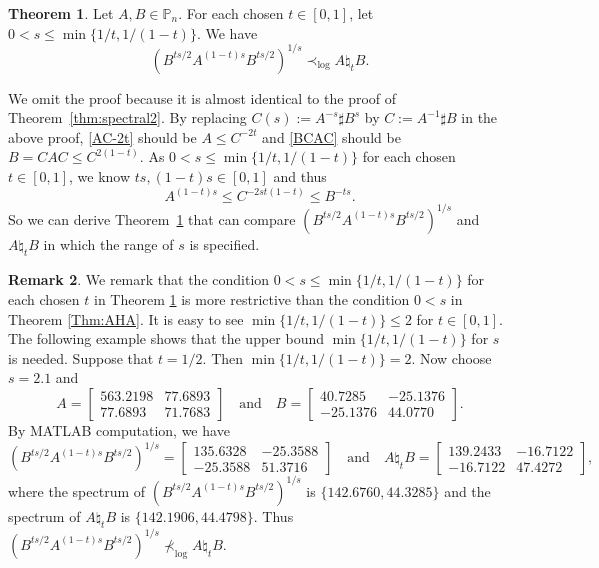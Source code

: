 \documentclass[12pt, reqno]{amsart}
\numberwithin{equation}{section}
\theoremstyle{definition}
\newtheorem{theorem}{Theorem}[section]
\newtheorem{remark}[theorem]{Remark}
\renewcommand{\le}{\leqslant}
\def\P{\mathbb P}
\begin{document}
\begin{theorem}\label{thm:spectral}
	Let $A, B \in \P_n$. For each chosen $t\in [0,1]$, let $0 < s \le \min\{1/t, 1/(1-t)\}$. We have
\begin{equation}\label{thm:natlog}
\left(B^{ts/2}A^{(1-t)s}B^{ts/2} \right)^{1/s}\prec_{\log} A \natural_t B.
\end{equation}
\end{theorem}

We omit the proof because it is almost identical to the proof of Theorem~\ref{thm:spectral2}. By replacing $C(s):=A^{-s}\sharp B^s$ by $C :=A^{-1}\sharp B$ in the above proof, \eqref{AC-2t} should be $A\le C^{-2t}$ and \eqref{BCAC} should be $B=CAC\le C^{2(1-t)}$. As $0<s\le \min\{1/t, 1/(1-t)\}$ for each chosen $t\in [0, 1]$, we know $ts, (1-t)s \in [0,1]$ and thus
\[
A^{(1-t)s} \le C^{-2st(1-t)} \le B^{-ts}.
\]
So we can derive Theorem~\ref{thm:spectral} that can compare $\left(B^{ts/2}A^{(1-t)s}B^{ts/2} \right)^{1/s}$ and $A\natural_t B$ in which the range of $s$ is specified.


\begin{remark} 
We remark that the  condition  $0<s \le \min\{1/t, 1/(1-t)\}$  for each chosen $t$ in Theorem \ref{thm:spectral} is more restrictive than the condition $0<s$ in Theorem \ref{Thm:AHA}. It is easy to see $\min\{1/t, 1/(1-t)\} \le 2$ for $t\in[0, 1]$. The following example shows that the upper bound $\min\{1/t, 1/(1-t)\}$ for $s$ is needed. Suppose that $t=1/2$. Then $\min\{1/t, 1/(1-t)\} = 2$. Now choose $s=2.1$ and
\[
A=
\begin{bmatrix}
563.2198 &  77.6893\\
   77.6893 &  71.7683
\end{bmatrix}
 \quad \text{and} \quad
B = 
 \begin{bmatrix}
40.7285 & -25.1376\\
  -25.1376  & 44.0770
  \end{bmatrix}.
\]
By MATLAB computation, we have
\[
\left(B^{ts/2}A^{(1-t)s}B^{ts/2} \right)^{1/s} =
\begin{bmatrix}
 135.6328 & -25.3588\\
  -25.3588  & 51.3716 
    \end{bmatrix}
\quad \text{and} \quad
A\natural_t B =
\begin{bmatrix}
139.2433 & -16.7122\\
  -16.7122 &  47.4272
\end{bmatrix},
\]
where the spectrum of $\left(B^{ts/2}A^{(1-t)s}B^{ts/2} \right)^{1/s}$ is $\{142.6760, 44.3285\}$ and the spectrum of $A\natural_t B$  is $\{142.1906, 44.4798\}$. Thus $\left(B^{ts/2}A^{(1-t)s}B^{ts/2} \right)^{1/s}\not\prec_{\log} A\natural_t B$.
\end{remark}
\end{document}
